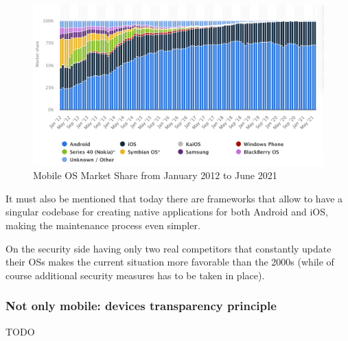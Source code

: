 \begin{figure}[!ht]
    \centering
    \includegraphics[scale=0.3]{document/chapters/chapter_1/images/os_market_share_2012_to_2021.png}
    \caption{Mobile OS Market Share from January 2012 to June 2021 \cite{mobile_and_desktop_os_market}}
    \label{fig:os_market_share_2012_to_2021}
\end{figure}

It must also be mentioned that today there are frameworks that allow to have a singular codebase for creating native applications for both Android and iOS, making the maintenance process even simpler.

On the security side having only two real competitors that constantly update their OSs makes the current situation more favorable than the 2000s (while of course additional security measures has to be taken in place).

\subsubsection{Not only mobile: devices transparency principle}
TODO
